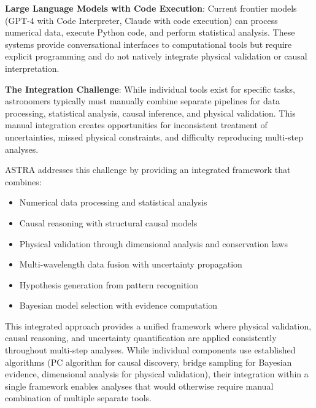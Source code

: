 \documentclass[usenatbib]{rasti}
\begin{document}
\textbf{Large Language Models with Code Execution}: Current frontier models (GPT-4 with Code Interpreter, Claude with code execution) can process numerical data, execute Python code, and perform statistical analysis. These systems provide conversational interfaces to computational tools but require explicit programming and do not natively integrate physical validation or causal interpretation.

\textbf{The Integration Challenge}: While individual tools exist for specific tasks, astronomers typically must manually combine separate pipelines for data processing, statistical analysis, causal inference, and physical validation. This manual integration creates opportunities for inconsistent treatment of uncertainties, missed physical constraints, and difficulty reproducing multi-step analyses.

ASTRA addresses this challenge by providing an integrated framework that combines:
\begin{itemize}
\item Numerical data processing and statistical analysis
\item Causal reasoning with structural causal models
\item Physical validation through dimensional analysis and conservation laws
\item Multi-wavelength data fusion with uncertainty propagation
\item Hypothesis generation from pattern recognition
\item Bayesian model selection with evidence computation
\end{itemize}

This integrated approach provides a unified framework where physical validation, causal reasoning, and uncertainty quantification are applied consistently throughout multi-step analyses. While individual components use established algorithms (PC algorithm for causal discovery, bridge sampling for Bayesian evidence, dimensional analysis for physical validation), their integration within a single framework enables analyses that would otherwise require manual combination of multiple separate tools.
\end{document}
